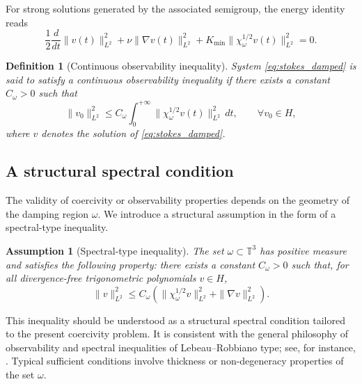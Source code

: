 \documentclass[preprint,12pt]{elsarticle}
\newtheorem{definition}    [theorem]{Definition}
\newtheorem{assumption}[theorem]{Assumption}
\begin{document}
For strong solutions generated by the associated semigroup, the energy identity reads
\begin{equation}
\label{eq:stokes_energy}
\frac{1}{2}\frac{d}{dt}\|v(t)\|_{L^2}^2
+
\nu\|\nabla v(t)\|_{L^2}^2
+
K_{\min}\|\chi_\omega^{1/2}v(t)\|_{L^2}^2
=0.
\end{equation}

\begin{definition}[Continuous observability inequality]
\label{def:observability}
System \eqref{eq:stokes_damped} is said to satisfy a continuous observability
inequality if there exists a constant $C_\omega>0$ such that
\begin{equation}
\label{eq:observability}
\|v_0\|_{L^2}^2
\le
C_\omega
\int_0^{+\infty}
\|\chi_\omega^{1/2}v(t)\|_{L^2}^2\,dt,
\qquad \forall v_0\in H,
\end{equation}
where $v$ denotes the solution of \eqref{eq:stokes_damped}.
\end{definition}

\subsection{A structural spectral condition}

The validity of coercivity or observability properties depends on the geometry of
the damping region $\omega$.
We introduce a structural assumption in the form of a spectral-type inequality.

\begin{assumption}[Spectral-type inequality]
\label{ass:geo}
The set $\omega\subset\mathbb{T}^3$ has positive measure and satisfies the
following property: there exists a constant $C_\omega>0$ such that, for all
divergence-free trigonometric polynomials $v\in H$,
\begin{equation}
\label{eq:spectral_ineq}
\|v\|_{L^2}^2
\le
C_\omega
\left(
\|\chi_\omega^{1/2}v\|_{L^2}^2
+
\|\nabla v\|_{L^2}^2
\right).
\end{equation}
\end{assumption}

This inequality should be understood as a structural spectral condition tailored
to the present coercivity problem.
It is consistent with the general philosophy of observability and spectral
inequalities of Lebeau--Robbiano type; see, for instance,
\cite{LebeauRobbiano1995,apraiz2014observability}.
Typical sufficient conditions involve thickness or non-degeneracy properties of
the set $\omega$.
\end{document}

